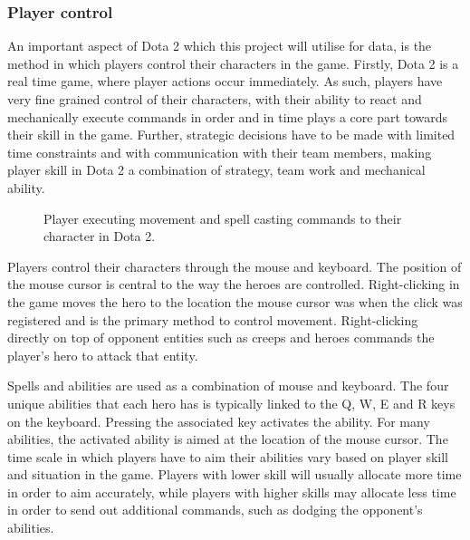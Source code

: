 \documentclass[Report.tex]{subfiles}
\begin{document}
\subsubsection{Player control}
An important aspect of Dota 2 which this project will utilise for data, is the method in which players control their characters in the game. Firstly, Dota 2 is a real time game, where player actions occur immediately. As such, players have very fine grained control of their characters, with their ability to react and mechanically execute commands in order and in time plays a core part towards their skill in the game. Further, strategic decisions have to be made with limited time constraints and with communication with their team members, making player skill in Dota 2 a combination of strategy, team work and mechanical ability. 

\begin{figure}[H]
\begin{subfigure}{0.4\textwidth}
\end{subfigure}
\hspace{\fill}
\begin{subfigure}{0.4\textwidth}
\end{subfigure}
\caption{Player executing movement and spell casting commands to their character in Dota 2.}
\end{figure}

Players control their characters through the mouse and keyboard. The position of the mouse cursor is central to the way the heroes are controlled. Right-clicking in the game moves the hero to the location the mouse cursor was when the click was registered and is the primary method to control movement. Right-clicking directly on top of opponent entities such as creeps and heroes commands the player's hero to attack that entity. 

Spells and abilities are used as a combination of mouse and keyboard. The four unique abilities that each hero has is typically linked to the Q, W, E and R keys on the keyboard. Pressing the associated key activates the ability. For many abilities, the activated ability is aimed at the location of the mouse cursor. The time scale in which players have to aim their abilities vary based on player skill and situation in the game. Players with lower skill will usually allocate more time in order to aim accurately, while players with higher skills may allocate less time in order to send out additional commands, such as dodging the opponent's abilities. 
\end{document}
